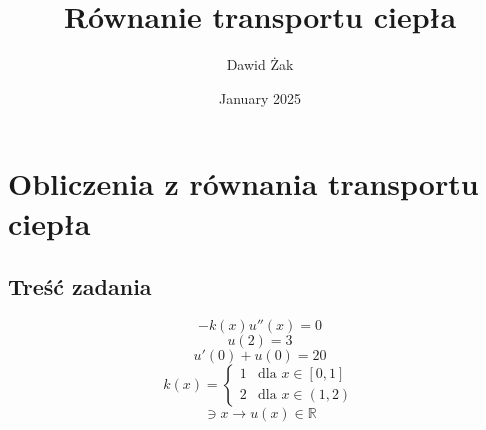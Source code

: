 \documentclass{article}
\title{Równanie transportu ciepła}
\author{Dawid Żak}
\date{January 2025}
\begin{document}
\maketitle

\section{Obliczenia z równania transportu ciepła}
\subsection{Treść zadania}
\begin{equation}
    -k(x)u''(x)=0
\end{equation}
\begin{equation}
    u(2) = 3
\end{equation}
\begin{equation}
    u'(0)+u(0)=20
    \label{brzeg}
\end{equation}
\begin{equation}
    k(x) =
    \begin{cases}
        1 & \text{dla } x \in [0, 1] \\
        2 & \text{dla } x \in (1, 2)
    \end{cases}
    \label{eq:piecewise}
\end{equation}
\begin{equation*}
    [0,2]\ni x \rightarrow u(x) \in \mathbb{R}
\end{equation*}
\end{document}
